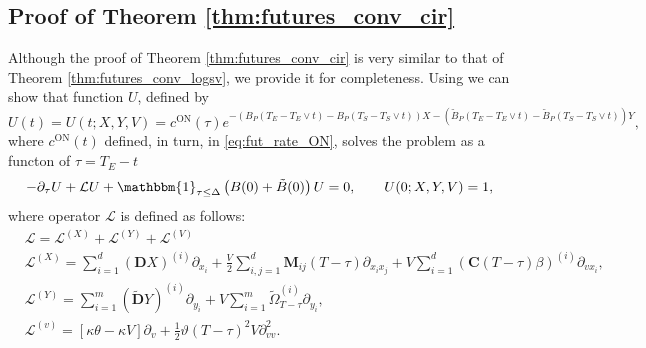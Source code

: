 \documentclass[pdftex,11pt,a4paper] {article}
\begin{document}
\subsection{Proof of Theorem \ref{thm:futures_conv_cir}}\label{app:futures_conv_cir}
Although the proof of Theorem \ref{thm:futures_conv_cir} is very similar to that of Theorem \ref{thm:futures_conv_logsv}, we provide it for completeness. Using \cite{Sepp2024} we can show that function $U$, defined by
\begin{equation*}
U(t)=U(t;X,Y,V)=c^{\mathrm{ON}}(\tau)e^{-\left(B_P(T_E-T_E\vee t)-B_P(T_S-T_S\vee t)\right)X-\left(\tilde B_P(T_E-T_E\vee t)-\tilde B_P(T_S-T_S\vee t)\right)Y},
\end{equation*}
where $c^{\mathrm{ON}}(t)$ defined, in turn, in \eqref{eq:fut_rate_ON}, solves the problem as a functon of $\tau=T_E-t$
\begin{equation}\label{eq:pde1f_cir}
-\partial_\tau U+\mathcal{L}U+\mathbbm{1}_{\tau\le \Delta}\left(B(0)+\tilde B(0)\right)U=0, \qquad U(0;X,Y,V)=1, 
\end{equation}
where operator $\mathcal{L}$ is defined as follows:
\begin{equation*}%
\begin{split}
&\mathcal{L}=\mathcal{L}^{(X)}+\mathcal{L}^{(Y)}+\mathcal{L}^{(V)}\\
&\mathcal{L}^{(X)}=\sum_{i=1}^d(\mathbf{D}X)^{(i)}\partial_{x_i}+
\frac{V}{2}\sum_{i,j=1}^d\mathbf{M}_{ij}(T-\tau)\partial_{x_ix_j}
+V\sum_{i=1}^d(\mathbf{C}(T-\tau)\beta)^{(i)}\partial_{vx_i},\\
&\mathcal{L}^{(Y)}=\sum_{i=1}^m(\tilde{\mathbf{D}}Y)^{(i)}\partial_{y_i}+V\sum_{i=1}^m\tilde{\Omega}_{T-\tau}^{(i)}\partial_{y_i},\\
&\mathcal{L}^{(v)}=\left[\kappa\theta-\kappa V\right]\partial_v+\frac{1}{2}\vartheta(T-\tau)^2V\partial^2_{vv}.
\end{split}
\end{equation*}
\end{document}
